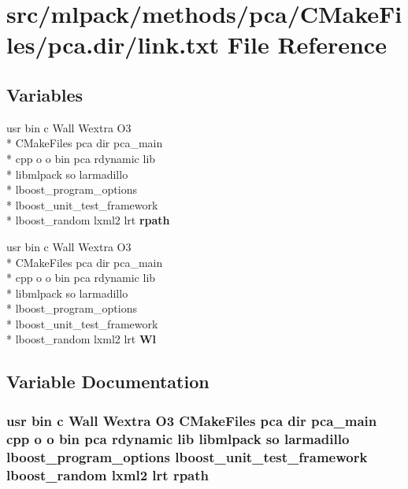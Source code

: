 \section{src/mlpack/methods/pca/\-C\-Make\-Files/pca.dir/link.txt File Reference}
\label{methods_2pca_2CMakeFiles_2pca_8dir_2link_8txt}
\subsection*{Variables}
\begin{DoxyCompactItemize}
\item 
usr bin c Wall Wextra O3 \\*
C\-Make\-Files pca dir pca\-\_\-main \\*
cpp o o bin pca rdynamic lib \\*
libmlpack so larmadillo \\*
lboost\-\_\-program\-\_\-options \\*
lboost\-\_\-unit\-\_\-test\-\_\-framework \\*
lboost\-\_\-random lxml2 lrt {\bf rpath}
\item 
usr bin c Wall Wextra O3 \\*
C\-Make\-Files pca dir pca\-\_\-main \\*
cpp o o bin pca rdynamic lib \\*
libmlpack so larmadillo \\*
lboost\-\_\-program\-\_\-options \\*
lboost\-\_\-unit\-\_\-test\-\_\-framework \\*
lboost\-\_\-random lxml2 lrt {\bf Wl}
\end{DoxyCompactItemize}


\subsection{Variable Documentation}
\subsubsection[{rpath}]{\setlength{\rightskip}{0pt plus 5cm}usr bin c Wall Wextra O3 C\-Make\-Files pca dir pca\-\_\-main cpp o o bin pca rdynamic lib libmlpack so larmadillo lboost\-\_\-program\-\_\-options lboost\-\_\-unit\-\_\-test\-\_\-framework lboost\-\_\-random lxml2 lrt rpath}\label{methods_2pca_2CMakeFiles_2pca_8dir_2link_8txt_a7a514de56ad29044172a73ff8c0198c4}


